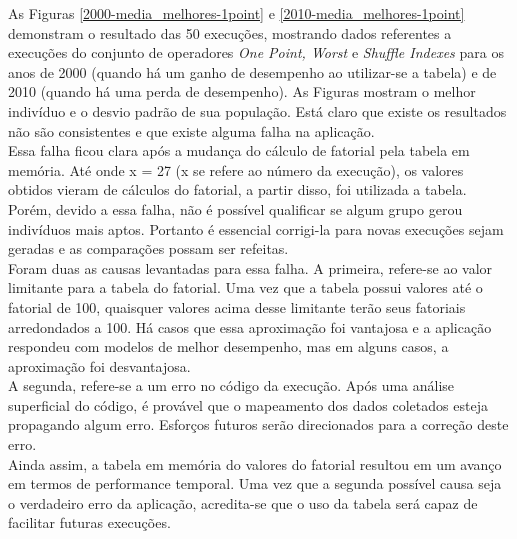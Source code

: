 As Figuras \ref{2000-media_melhores-1point} e \ref{2010-media_melhores-1point} demonstram o resultado das 50 execuções, mostrando dados referentes a execuções do conjunto de operadores {\it One Point, Worst} e {\it Shuffle Indexes} para os anos de 2000 (quando há um ganho de desempenho ao utilizar-se a tabela) e de 2010 (quando há uma perda de desempenho). As Figuras mostram o melhor indivíduo e o desvio padrão de sua população. Está claro que existe os resultados não são consistentes e que existe alguma falha na aplicação.\\

Essa falha ficou clara após a mudança do cálculo de fatorial pela tabela em memória. Até onde x = 27 (x se refere ao número da execução), os valores obtidos vieram de cálculos do fatorial, a partir disso, foi utilizada a tabela. Porém, devido a essa falha, não é possível qualificar se algum grupo gerou indivíduos mais aptos. Portanto é essencial corrigi-la para novas execuções sejam geradas e as comparações possam ser refeitas.\\

Foram duas as causas levantadas para essa falha. A primeira, refere-se ao valor limitante para a tabela do fatorial. Uma vez que a tabela possui valores até o fatorial de 100, quaisquer valores acima desse limitante terão seus fatoriais arredondados a 100. Há casos que essa aproximação foi vantajosa e a aplicação respondeu com modelos de melhor desempenho, mas em alguns casos, a aproximação foi desvantajosa.\\

A segunda, refere-se a um erro no código da execução. Após uma análise superficial do código, 
é provável que o mapeamento dos dados coletados esteja propagando algum erro. Esforços futuros serão direcionados para a correção deste erro.\\



Ainda assim, a tabela em memória do valores do fatorial resultou em um avanço em termos de performance temporal. Uma vez que a segunda possível causa seja o verdadeiro erro da aplicação, acredita-se que o uso da tabela será capaz de facilitar futuras execuções.\\

